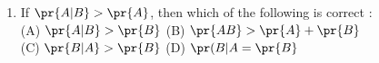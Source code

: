 \begin{enumerate}[label=\thechapter.\arabic*,ref=\thechapter.\theenumi]
\item If $\pr{A|B}>\pr{A}$, then which of the following is correct :\\
(A) $\pr{A|B}>\pr{B}$ (B) $\pr{AB}>\pr{A}+\pr{B}$\\
(C) $\pr{B|A}>\pr{B}$ (D) $\pr({B|A} = \pr{B}$\\
\end{enumerate}
